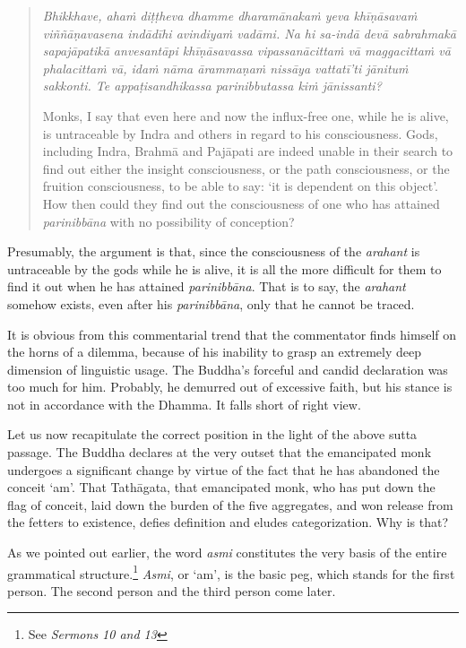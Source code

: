 \begin{quote}
\emph{Bhikkhave, ahaṁ diṭṭheva dhamme dharamānakaṁ yeva khīṇāsavaṁ viññāṇavasena indādīhi avindiyaṁ vadāmi. Na hi sa-indā devā sabrahmakā sapajāpatikā anvesantāpi khīṇāsavassa vipassanācittaṁ vā maggacittaṁ vā phalacittaṁ vā, idaṁ nāma ārammaṇaṁ nissāya vattatī'ti jānituṁ sakkonti. Te appaṭisandhikassa parinibbutassa kiṁ jānissanti?}

Monks, I say that even here and now the influx-free one, while he is alive, is untraceable by Indra and others in regard to his consciousness. Gods, including Indra, Brahmā and Pajāpati are indeed unable in their search to find out either the insight consciousness, or the path consciousness, or the fruition consciousness, to be able to say: `it is dependent on this object'. How then could they find out the consciousness of one who has attained \emph{parinibbāna} with no possibility of conception?
\end{quote}

Presumably, the argument is that, since the consciousness of the \emph{arahant} is untraceable by the gods while he is alive, it is all the more difficult for them to find it out when he has attained \emph{parinibbāna}. That is to say, the \emph{arahant} somehow exists, even after his \emph{parinibbāna}, only that he cannot be traced.

It is obvious from this commentarial trend that the commentator finds himself on the horns of a dilemma, because of his inability to grasp an extremely deep dimension of linguistic usage. The Buddha's forceful and candid declaration was too much for him. Probably, he demurred out of excessive faith, but his stance is not in accordance with the Dhamma. It falls short of right view.

Let us now recapitulate the correct position in the light of the above sutta passage. The Buddha declares at the very outset that the emancipated monk undergoes a significant change by virtue of the fact that he has abandoned the conceit `am'. That Tathāgata, that emancipated monk, who has put down the flag of conceit, laid down the burden of the five aggregates, and won release from the fetters to existence, defies definition and eludes categorization. Why is that?

As we pointed out earlier, the word \emph{asmi} constitutes the very basis of the entire grammatical structure.\footnote{See \emph{Sermons 10 and 13}} \emph{Asmi}, or `am', is the basic peg, which stands for the first person. The second person and the third person come later.

